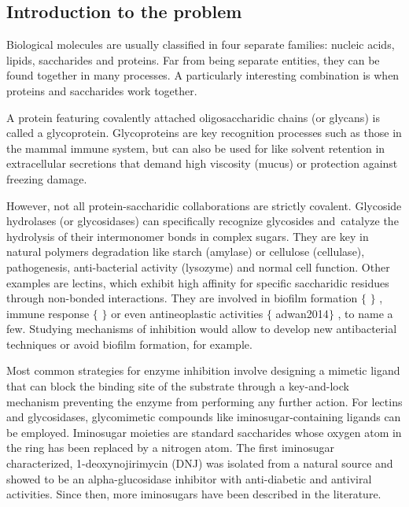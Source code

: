 \subsection{Introduction to the problem}
Biological molecules are usually classified in four separate families: nucleic acids, lipids, saccharides and proteins. Far from being separate entities, they can be found together in many processes. A particularly interesting combination is when proteins and saccharides work together.

A protein featuring covalently attached oligosaccharidic chains (or glycans) is called a glycoprotein. Glycoproteins are key recognition processes such as those in the mammal immune system, but can also be used for like solvent retention in extracellular secretions that demand high viscosity (mucus) or protection against freezing damage.

However, not all protein-saccharidic collaborations are strictly covalent. Glycoside hydrolases (or glycosidases) can specifically recognize glycosides and\ catalyze the hydrolysis of their intermonomer bonds in complex sugars.  They are key in natural polymers degradation like starch (amylase) or cellulose (cellulase), pathogenesis, anti-bacterial activity (lysozyme) and normal cell function. Other examples are lectins, which exhibit high affinity for specific saccharidic residues through non-bonded interactions. They are involved in biofilm formation $ \{ $ $ \} $ , immune response $ \{ $ $ \} $  or even antineoplastic activities $ \{ $ adwan2014$ \} $ , to name a few. Studying mechanisms of inhibition would allow to develop new antibacterial techniques or avoid biofilm formation, for example.

Most common strategies for enzyme inhibition involve designing a mimetic ligand that can block the binding site of the substrate through a key-and-lock mechanism preventing the enzyme from performing any further action. For lectins and glycosidases, glycomimetic compounds like iminosugar-containing ligands can be employed. Iminosugar moieties are standard saccharides whose oxygen atom in the ring has been replaced by a nitrogen atom. The first iminosugar characterized, 1-deoxynojirimycin (DNJ) was isolated from a natural source and showed to be an alpha-glucosidase inhibitor with anti-diabetic and antiviral activities. Since then, more iminosugars have been described in the literature.

